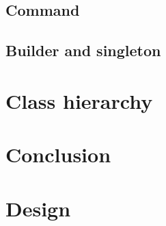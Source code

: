 \documentclass[a4paper,11pt]{article}
\begin{document}
\subsection{Command}
\subsection{Builder and singleton}
\label{sec:patterns}
\section{Class hierarchy}
\label{sec:cls_hier}
\section{Conclusion}
\appendix
\section{Design}
\end{document}

